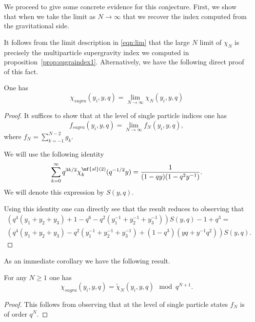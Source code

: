 We proceed to give some concrete evidence for this conjecture.
First, we show that when we take the limit as $N \to \infty$ that we recover the index computed from the gravitational side.

\parsec

It follows from the limit description in \eqref{eqn:lim} that the large $N$ limit of $\chi_N$ is precisely the multiparticle supergravity index we computed in proposition~\ref{prop:sugraindex1}. 
Alternatively, we have the following direct proof of this fact. 

\begin{prop}
One has
\begin{equation}
\chi_{sugra}(y_i, y, q) = \lim_{N \to \infty} \chi_N(y_i,y,q)
\end{equation}
\end{prop}

\begin{proof}
It suffices to show that at the level of single particle indices one has
\begin{equation}
f_{sugra}(y_i, y, q) = \lim_{N \to \infty} f_N(y_i,y,q) ,
\end{equation}
where $f_N = \sum_{k = -1}^{N-2} g_k$. 

We will use the following identity 
\begin{equation}
\sum_{k=0}^\infty q^{3k/2} \chi_{k}^{\mf{sl}(2)}(q^{-1/2}y) = \frac{1}{(1-q y)(1-q^2 y^{-1})} .
\end{equation}
We will denote this expression by $S(y,q)$.

Using this identity one can directly see that the result reduces to observing that
\begin{multline}
\left(q^4 (y_1+y_2+y_3) + 1 - q^6 - q^2 (y_1^{-1} + y_2^{-1} + y_3^{-1})\right)S(y,q) - 1 + q^3= \\
\left(q^4(y_1+y_2+y_3)-q^2(y_1^{-1} + y_2^{-1} + y_3^{-1})+(1-q^3)(yq + y^{-1} q^2) \right) S(y,q) .
\end{multline}



\end{proof}

As an immediate corollary we have the following result.
\begin{cor}
For any $N \geq 1$ one has
\begin{equation}
\chi_{sugra}(y_i,y,q) = \tilde{\chi}_N(y_i,y,q) \mod q^{N+1} .
\end{equation}
\end{cor}
\begin{proof}
This follows from observing that at the level of single particle states $f_N$ is of order $q^{N}$.
\end{proof}